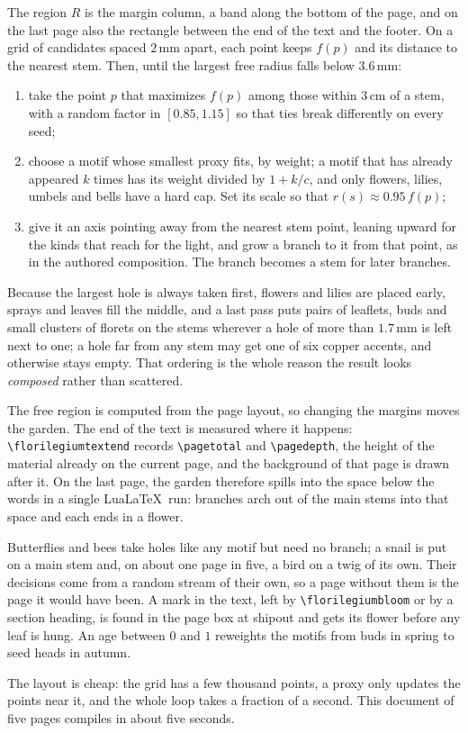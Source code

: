 \begin{construction}[Growth]
The region $R$ is the margin column, a band along the bottom of the page, and on the last
page also the rectangle between the end of the text and the footer. On a grid of candidates
spaced $2\,$mm apart, each point keeps $f(p)$ and its distance to the nearest stem. Then,
until the largest free radius falls below $3.6\,$mm:
\begin{enumerate}
  \item take the point $p$ that maximizes $f(p)$ among those within $3\,$cm of a stem, with
        a random factor in $[0.85,1.15]$ so that ties break differently on every seed;
  \item choose a motif whose smallest proxy fits, by weight; a motif that has already
        appeared $k$ times has its weight divided by $1+k/c$, and only flowers, lilies,
        umbels and bells have a hard cap. Set its scale so that $r(s)\approx0.95\,f(p)$;
  \item give it an axis pointing away from the nearest stem point, leaning upward for the
        kinds that reach for the light, and grow a branch to it from that point, as in the
        authored composition. The branch becomes a stem for later branches.
\end{enumerate}
Because the largest hole is always taken first, flowers and lilies are placed early,
sprays and leaves fill the middle, and a last pass puts pairs of leaflets, buds and small
clusters of florets on the stems wherever a hole of more than $1.7\,$mm is left next to
one; a hole far from any stem may get one of six copper accents, and otherwise stays empty.
That ordering is the whole reason the result looks \emph{composed} rather than scattered.
\end{construction}

\begin{remark}
The free region is computed from the page layout, so changing the margins moves the
garden. The end of the text is measured where it happens: \verb|\florilegiumtextend|
records \verb|\pagetotal| and \verb|\pagedepth|, the height of the material already on the
current page, and the background of that page is drawn after it. On the last page, the
garden therefore spills into the space below the words in a single Lua\LaTeX\ run: branches
arch out of the main stems into that space and each ends in a flower.
\end{remark}

\begin{remark}
Butterflies and bees take holes like any motif but need no branch; a snail is put on a
main stem and, on about one page in five, a bird on a twig of its own. Their decisions come
from a random stream of their own, so a page without them is the page it would have been.
A mark in the text, left by \verb|\florilegiumbloom| or by a section heading, is found in
the page box at shipout and gets its flower before any leaf is hung. An age between $0$
and $1$ reweights the motifs from buds in spring to seed heads in autumn.
\end{remark}

\begin{remark}[Cost]
The layout is cheap: the grid has a few thousand points, a proxy only updates the points
near it, and the whole loop takes a fraction of a second. This document of five pages
compiles in about five seconds.
\end{remark}
